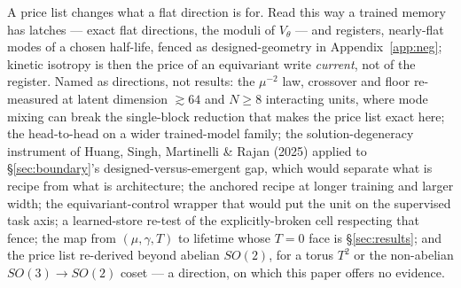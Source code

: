 \documentclass{article}
\begin{document}
A price list changes what a flat direction is for. Read this way a trained memory has latches --- exact flat directions, the moduli of $V_\theta$ --- and registers, nearly-flat modes of a chosen half-life, fenced as designed-geometry in Appendix~\ref{app:neg}; kinetic isotropy is then the price of an equivariant write \emph{current}, not of the register. Named as directions, not results: the $\mu^{-2}$ law, crossover and floor re-measured at latent dimension $\gtrsim64$ and $N\ge8$ interacting units, where mode mixing can break the single-block reduction that makes the price list exact here; the head-to-head on a wider trained-model family; the solution-degeneracy instrument of Huang, Singh, Martinelli \& Rajan (2025) applied to \S\ref{sec:boundary}'s designed-versus-emergent gap, which would separate what is recipe from what is architecture; the anchored recipe at longer training and larger width; the equivariant-control wrapper that would put the unit on the supervised task axis; a learned-store re-test of the explicitly-broken cell respecting that fence; the map from $(\mu,\gamma,T)$ to lifetime whose $T=0$ face is \S\ref{sec:results}; and the price list re-derived beyond abelian $SO(2)$, for a torus $T^2$ or the non-abelian $SO(3)\to SO(2)$ coset --- a direction, on which this paper offers no evidence.
\end{document}
